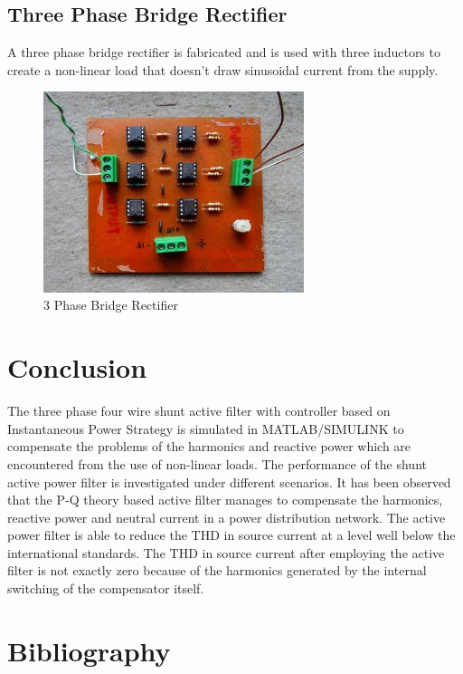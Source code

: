 \documentclass[journal,twoside]{IEEEtran}
\begin{document}
\subsection{Three Phase Bridge Rectifier}
A three phase bridge rectifier is fabricated and is used
with three inductors to create a non-linear load that doesn't
draw sinusoidal current from the supply.
\begin{figure}[!ht]
\centering
\includegraphics[width=3in]{7}
\caption{3 Phase Bridge Rectifier}
\label{f7}
\end{figure}

\section{Conclusion}
The three phase four wire shunt active filter with controller
based on Instantaneous Power Strategy is simulated in
MATLAB/SIMULINK to compensate the problems of the
harmonics and reactive power which are encountered from the
use of non-linear loads. The performance of the shunt active
power filter is investigated under different scenarios. It has
been observed that the P-Q theory based active filter manages
to compensate the harmonics, reactive power and neutral
current in a power distribution network. The active power
filter is able to reduce the THD in source current at a level
well below the international standards. The THD in source
current after employing the active filter is not exactly zero
because of the harmonics generated by the internal switching
of the compensator itself.


\section*{Bibliography}
\end{document}
